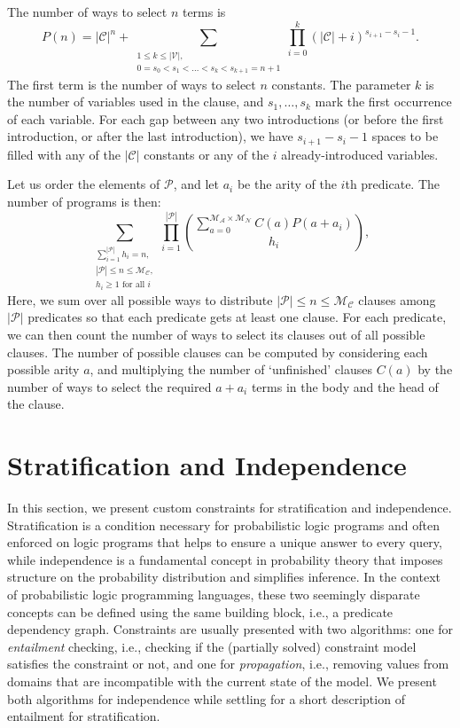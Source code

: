 \documentclass[runningheads]{llncs}
\newcommand{\predicates}{\mathcal{P}}
\newcommand{\variables}{\mathcal{V}}
\newcommand{\constants}{\mathcal{C}}
\newcommand{\maxArity}{\mathcal{M}_{\mathcal{A}}}
\newcommand{\maxNumNodes}{\mathcal{M}_{\mathcal{N}}}
\newcommand{\maxNumClauses}{\mathcal{M}_{\mathcal{C}}}
\begin{document}
The number of ways to select $n$ terms is
\[
  P(n) = |\constants{}|^n + \sum_{\substack{1 \le k \le |\variables{}|, \\ 0 =
      s_0 < s_1 < \dots < s_k < s_{k+1} = n+1}} \prod_{i=0}^k (|\constants{}| +
  i)^{s_{i+1} - s_i - 1}.
\]
The first term is the number of ways to select $n$ constants. The parameter $k$
is the number of variables used in the clause, and $s_1, \dots, s_k$ mark the
first occurrence of each variable. For each gap between any two introductions
(or before the first introduction, or after the last introduction), we have
$s_{i+1}-s_i-1$ spaces to be filled with any of the $|\constants{}|$ constants
or any of the $i$ already-introduced variables.

Let us order the elements of $\predicates{}$, and let $a_i$ be the arity of the
$i$th predicate. The number of programs is then:
\[
  \sum_{\substack{ \sum_{i=1}^{|\predicates{}|} h_i = n,\\
      |\predicates{}| \le n \le \maxNumClauses{},\\
      h_i \ge 1 \text{ for all } i}} \prod_{i=1}^{|\predicates{}|}
  \binom{\sum_{a=0}^{\maxArity{} \times \maxNumNodes{}} C(a) P(a+a_i)}{h_i},
\]
Here, we sum over all possible ways to distribute $|\predicates{}| \le n \le
\maxNumClauses{}$ clauses among $|\predicates{}|$ predicates so that each
predicate gets at least one clause. For each predicate, we can then count the
number of ways to select its clauses out of all possible clauses. The number of
possible clauses can be computed by considering each possible arity $a$, and
multiplying the number of `unfinished' clauses $C(a)$ by the number of ways to
select the required $a+a_i$ terms in the body and the head of the clause.

\section{Stratification and Independence} \label{sec:independence}

In this section, we present custom constraints for stratification and
independence. Stratification is a condition necessary for probabilistic logic
programs \cite{DBLP:conf/padl/MantadelisR17} and often enforced on logic
programs \cite{DBLP:journals/tcs/Bidoit91} that helps to ensure a unique answer
to every query, while independence is a fundamental concept in probability
theory that imposes structure on the probability distribution and simplifies
inference. In the context of probabilistic logic programming languages, these
two seemingly disparate concepts can be defined using the same building block,
i.e., a predicate dependency graph. Constraints are usually presented with two
algorithms: one for \emph{entailment} checking, i.e., checking if the (partially
solved) constraint model satisfies the constraint or not, and one for
\emph{propagation}, i.e., removing values from domains that are incompatible
with the current state of the model. We present both algorithms for independence
while settling for a short description of entailment for stratification.
\end{document}
